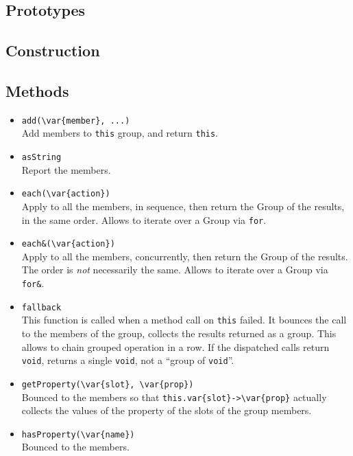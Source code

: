 \subsection{Prototypes}
\subsection{Construction}
\subsection{Methods}

\begin{itemize}
\item \lstinline|add(\var{member}, ...)|\\
  Add members to \lstinline|this| group, and return \lstinline|this|.

\item \lstinline|asString|\\
  Report the members.

\item \lstinline|each(\var{action})|\\
  Apply  to all the members, in sequence, then return the
  Group of the results, in the same order.  Allows to iterate over a
  Group via \lstinline|for|.

\item \lstinline|each&(\var{action})|\\
  Apply  to all the members, concurrently, then return the
  Group of the results.  The order is \emph{not} necessarily the same.
  Allows to iterate over a Group via \lstinline|for&|.

\item \lstinline|fallback|\\
  This function is called when a method call on \lstinline|this|
  failed.  It bounces the call to the members of the group, collects
  the results returned as a group.  This allows to chain grouped
  operation in a row.  If the dispatched calls return
  \lstinline|void|, returns a single \lstinline|void|, not a ``group
  of \lstinline|void|''.

\item \lstinline|getProperty(\var{slot}, \var{prop})|\\
  Bounced to the members so that
  \lstinline|this.var{slot}->\var{prop}| actually collects the values
  of the property  of the slots  of the group
  members.

\item \lstinline|hasProperty(\var{name})|\\
  Bounced to the members.


\end{itemize}
